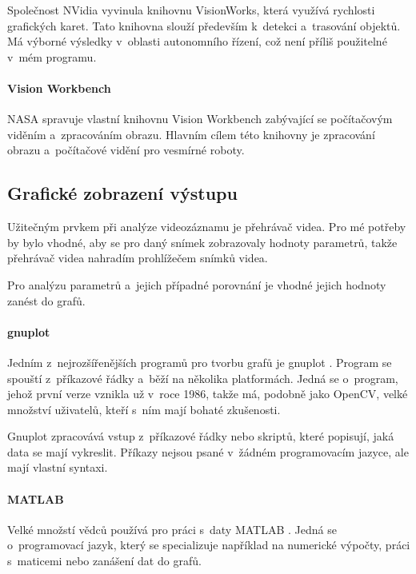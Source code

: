 Společnost NVidia vyvinula knihovnu VisionWorks, která využívá rychlosti grafických karet. Tato knihovna slouží především k~detekci a~trasování objektů. Má výborné výsledky v~oblasti autonomního řízení, což není příliš použitelné v~mém programu.

\paragraph{Vision Workbench}

NASA spravuje vlastní knihovnu Vision Workbench zabývající se počítačovým viděním a~zpracováním obrazu. Hlavním cílem této knihovny je zpracování obrazu a~počítačové vidění pro vesmírné roboty.

\subsection{Grafické zobrazení výstupu}

Užitečným prvkem při analýze videozáznamu je přehrávač videa. Pro mé potřeby by bylo vhodné, aby se pro daný snímek zobrazovaly hodnoty parametrů, takže přehrávač videa nahradím prohlížečem snímků videa.

Pro analýzu parametrů a~jejich případné porovnání je vhodné jejich hodnoty zanést do grafů.

\paragraph{gnuplot}

Jedním z~nejrozšířenějších programů pro tvorbu grafů je gnuplot \citep{gnuplot}. Program se spouští z~příkazové řádky a~běží na několika platformách. Jedná se o~program, jehož první verze vznikla už v~roce 1986, takže má, podobně jako OpenCV, velké množství uživatelů, kteří s~ním mají bohaté zkušenosti.

Gnuplot zpracovává vstup z~příkazové řádky nebo skriptů, které popisují, jaká data se mají vykreslit. Příkazy nejsou psané v~žádném programovacím jazyce, ale mají vlastní syntaxi.

\paragraph{MATLAB}

Velké množstí vědců používá pro práci s~daty MATLAB \citep{MATLAB}. Jedná se o~programovací jazyk, který se specializuje například na numerické výpočty, práci s~maticemi nebo zanášení dat do grafů.

